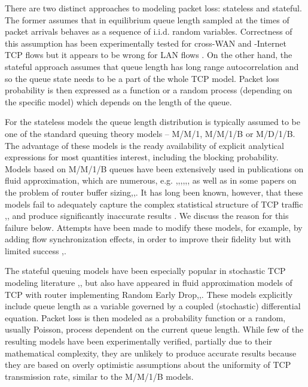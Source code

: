 \documentclass{IEEEtran}[10pt,letterpaper,conference]
\begin{document}
There are two distinct approaches to modeling packet loss: stateless and stateful. The former assumes that in equilibrium queue length sampled at the times of packet arrivals behaves as a sequence of i.i.d. random variables. Correctness of this assumption has been experimentally tested for cross-WAN and -Internet TCP flows but it appears to be wrong for LAN flows \cite{AltAvrBar}. On the other hand, the stateful approach assumes that queue length has long range autocorrelation and so the queue state needs to be a part of the whole TCP model. Packet loss probability is then expressed as a function or a random process (depending on the specific model) which depends on the length of the queue.

For the stateless models the queue length distribution is typically assumed to be one of the standard queuing theory models -- M/M/1, M/M/1/B or M/D/1/B. The advantage of these models is the ready availability of explicit analytical expressions for most quantities interest, including the blocking probability. Models based on M/M/1/B queues have been extensively used in publications on fluid approximation, which are numerous, e.g. \cite{KelMauTan},\cite{Vin},\cite{Sri},\cite{JohTan},\cite{DebShaSri},\cite{YinDulSri}, as well as in some papers on the problem of router buffer sizing\cite{EnaGanGoeMcKeoRou},\cite{RaiWis},\cite{RaiTowWis}. It has long been known, however, that these models fail to adequately capture the complex statistical structure of TCP traffic \cite{PaxFlo},\cite{GoeGau},\cite{JiaDov} and produce significantly inaccurate results \cite{GenMar}. We discuss the reason for this failure below. Attempts have been made to modify these models, for example, by adding flow synchronization effects, in order to improve their fidelity but with limited success \cite{BacHon},\cite{BacHon1}.

The stateful queuing models have been especially popular in stochastic TCP modeling literature \cite{BacMcDonJul},\cite{BacMcDonReyJul},\cite{ChaDeVle} but also have appeared in fluid approximation models of TCP with router implementing Random Early Drop\cite{HolMisTowGon},\cite{MisGonTow},\cite{LowPagWangDoy}. These models explicitly include queue length as a variable governed by a coupled (stochastic) differential equation. Packet loss is then modeled as a probability function or a random, usually Poisson, process dependent on the current queue length. While few of the resulting models have been experimentally verified, partially due to their mathematical complexity, they are unlikely to produce accurate results because they are based on overly optimistic assumptions about the uniformity of TCP transmission rate, similar to the M/M/1/B models.
\end{document}
